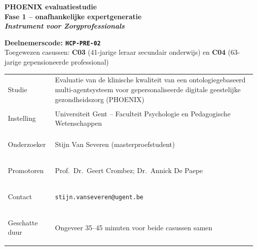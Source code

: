 \documentclass[11pt,a4paper]{article}
\renewcommand{\arraystretch}{1.28}
\begin{document}
\thispagestyle{fancy}
\vspace*{0.3cm}

\begin{tcolorbox}[
  colback=DarkBlue,colframe=DarkBlue,
  arc=3mm,left=14pt,right=14pt,top=12pt,bottom=12pt,
  width=\textwidth
]
\centering
{\fontsize{22}{28}\selectfont\bfseries\color{white}
PHOENIX evaluatiestudie\\[0.3em]
\fontsize{15}{20}\selectfont\color{AccentBlue}
Fase 1 -- onafhankelijke expertgeneratie\\[0.2em]
\fontsize{12}{16}\selectfont\color{white}
\textit{Instrument voor Zorgprofessionals}
}
\end{tcolorbox}

\vspace{0.6cm}

\begin{center}
\begin{tcolorbox}[
  colback=AccentBlue,colframe=PrimaryBlue,
  arc=2.5mm,boxrule=1.2pt,left=12pt,right=12pt,top=10pt,bottom=10pt,
  width=0.86\textwidth
]
\centering
{\large\bfseries\color{DarkBlue}Deelnemerscode: \texttt{HCP-PRE-02}}\\[0.5em]
{\normalsize\color{SlateMid}
Toegewezen casussen:\quad
\textbf{\color{PrimaryBlue}C03} (41-jarige leraar secundair onderwijs)
\quad en \quad
\textbf{\color{PrimaryBlue}C04} (63-jarige gepensioneerde professional)
}
\end{tcolorbox}
\end{center}

\vspace{0.5cm}

\begin{center}
\begin{tcolorbox}[
  colback=SoftBG,colframe=BorderGrey,
  arc=2mm,left=10pt,right=10pt,top=9pt,bottom=9pt,
  width=0.92\textwidth
]
\small\renewcommand{\arraystretch}{1.28}
\begin{tabularx}{\textwidth}{@{}>{\bfseries\raggedright\arraybackslash}p{}X@{}}
Studie & Evaluatie van de klinische kwaliteit van een ontologiegebaseerd multi-agentsysteem voor gepersonaliseerde digitale geestelijke gezondheidszorg (PHOENIX) \\
Instelling & Universiteit Gent -- Faculteit Psychologie en Pedagogische Wetenschappen \\
Onderzoeker & Stijn Van Severen (masterproefstudent) \\
Promotoren & Prof.\ Dr.\ Geert Crombez; Dr.\ Annick De Paepe \\
Contact & \texttt{stijn.vanseveren@ugent.be} \\
Geschatte duur & Ongeveer 35--45 minuten voor beide casussen samen \\
\end{tabularx}
\end{tcolorbox}
\end{center}
\end{document}
